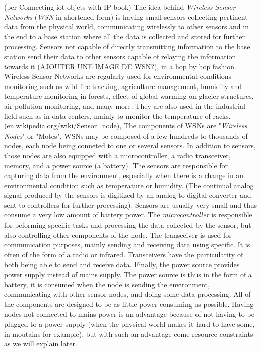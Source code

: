 (per Connecting iot objets with IP book)
The idea behind \textit{Wireless Sensor Networks} (\textit{WSN} in shortened form) is having small sensors collecting pertinent data from the physical world, communicating wirelessly to other sensors and in the end to a base station where all the data is collected and stored for further processing. Sensors not capable of directly transmitting information to the base station send their data to other sensors capable of relaying the information towards it (AJOUTER UNE IMAGE DE WSN?), in a hop by hop fashion.\\

Wireless Sensor Networks are regularly used for environmental conditions monitoring such as wild fire tracking, agriculture management, humidity and temperature monitoring in forests, effect of global warming on glacier structures, air pollution monitoring, and many more. They are also used in the industrial field such as in data centers, mainly to monitor the temperature of racks.  \\

(en.wikipedia.org/wiki/Sensor\_node),
The components of WSNs are "\textit{Wireless Nodes}" or "Motes". WSNs may be composed of a few hundreds to thousands of nodes, each node being conneted to one or several sensors. In addition to sensors, those nodes are also equipped with a microcontroller, a radio transceiver, memory, and a power source (a battery). The sensors are responsible for capturing data from the environment, especially when there is a change in an environmental condition such as temperature or humidity. (The continual analog signal produced by the sensors is digitized by an analog-to-digital converter and sent to controllers for further processing). Sensors are usually very small and thus consume a very low amount of battery power. The \textit{microcontroller} is responsible for peforming specific tasks and processing the data collected by the sensor, but also controlling other components of the node. The transceiver is used for communication purposes, mainly sending and receiving data using specific. It is often of the form of a radio or infrared. Transceivers have the particularity of both being able to send and receive data. Finally, the power source provides power supply instead of mains supply. The power source is thus in the form of a battery, it is consumed when the node is sending the environment, communicating with other sensor nodes, and doing some data processing. All of the components are designed to be as little power-consuming as possible. Having nodes not connected to mains power is an advantage because of not having to be plugged to a power supply (when the physical world makes it hard to have some, in moutains for example), but with such an advantage come resource constraints as we will explain later.  \\

